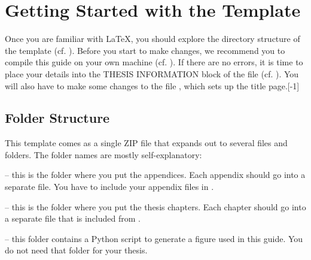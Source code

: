\section{Getting Started with the Template}

Once you are familiar with LaTeX, you should explore the directory structure of the template (cf. ). Before you start to make changes, we recommend you to compile this guide on your own machine (cf. ).
If there are no errors, it is time to place your details into the THESIS INFORMATION block of the  file (cf. ).
You will also have to make some changes to the file , which sets up the title page.[-1\baselineskip]


\subsection{Folder Structure}
\label{sec:folders}

This template comes as a single ZIP file that expands out to several files and folders. The folder names are mostly self-explanatory:

 -- this is the folder where you put the appendices. Each appendix should go into a separate  file. You have to include your appendix files in .

 -- this is the folder where you put the thesis chapters. Each chapter should go into a separate  file that is included from .

 -- this folder contains a Python script to generate a figure used in this guide. You do not need that folder for your thesis.

